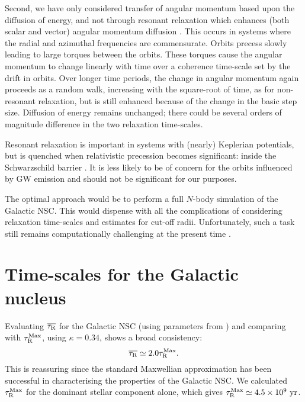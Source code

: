 Second, we have only considered transfer of angular momentum based upon the diffusion of energy, and not through resonant relaxation which enhances (both scalar and vector) angular momentum diffusion \citep{Rauch1996,Rauch1998,Gurkan2007,Eilon2009,Madigan2011}. This occurs in systems where the radial and azimuthal frequencies are commensurate. Orbits precess slowly leading to large torques between the orbits. These torques cause the angular momentum to change linearly with time over a coherence time-scale set by the drift in orbits. Over longer time periods, the change in angular momentum again proceeds as a random walk, increasing with the square-root of time, as for non-resonant relaxation, but is still enhanced because of the change in the basic step size. Diffusion of energy remains unchanged; there could be several orders of magnitude difference in the two relaxation time-scales.

Resonant relaxation is important in systems with (nearly) Keplerian potentials, but is quenched when relativistic precession becomes significant: inside the Schwarzschild barrier \citep{Merritt2011}. It is less likely to be of concern for the orbits influenced by GW emission \citep{Sigurdsson1997} and should not be significant for our purposes.

The optimal approach would be to perform a full $N$-body simulation of the Galactic NSC. This would dispense with all the complications of considering relaxation time-scales and estimates for cut-off radii. Unfortunately, such a task still remains computationally challenging at the present time \citep[e.g.,][]{Li2012}.

\section{Time-scales for the Galactic nucleus}\label{sec:tauGC}

Evaluating $\overline{\tau_\mathrm{R}}$ for the Galactic NSC (using parameters from ) and comparing with $\tau_\mathrm{R}^\mathrm{Max}$,  using $\kappa = 0.34$, shows a broad consistency:
\begin{equation}
\overline{\tau_\mathrm{R}} \simeq 2.0 \tau_\mathrm{R}^\mathrm{Max}.
\end{equation}
This is reassuring since the standard Maxwellian approximation has been successful in characterising the properties of the Galactic NSC. We calculated $\tau_\mathrm{R}^\mathrm{Max}$ for the dominant stellar component alone, which gives $\tau_\mathrm{R}^\mathrm{Max}\simeq 4.5 \times 10^9~\mathrm{yr}$.


